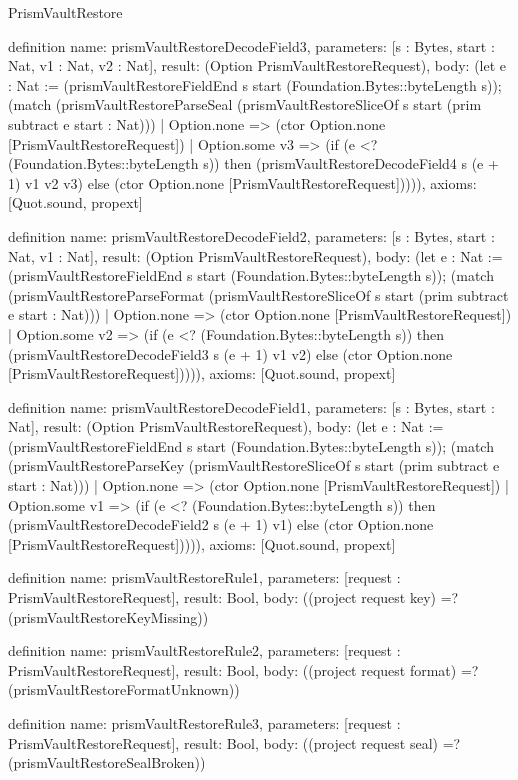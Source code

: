 \begin{lexlean}{PrismVaultRestore}
\begin{semanticmodule}
definition{
  name: prismVaultRestoreDecodeField3,
  parameters: [s : Bytes, start : Nat, v1 : Nat, v2 : Nat],
  result: (Option PrismVaultRestoreRequest),
  body: (let e : Nat := (prismVaultRestoreFieldEnd s start (Foundation.Bytes::byteLength s)); (match (prismVaultRestoreParseSeal (prismVaultRestoreSliceOf s start (prim subtract e start : Nat)))
    | Option.none => (ctor Option.none [PrismVaultRestoreRequest])
    | Option.some v3 => (if (e <? (Foundation.Bytes::byteLength s)) then (prismVaultRestoreDecodeField4 s (e + 1) v1 v2 v3) else (ctor Option.none [PrismVaultRestoreRequest])))),
  axioms: [Quot.sound, propext]
}

definition{
  name: prismVaultRestoreDecodeField2,
  parameters: [s : Bytes, start : Nat, v1 : Nat],
  result: (Option PrismVaultRestoreRequest),
  body: (let e : Nat := (prismVaultRestoreFieldEnd s start (Foundation.Bytes::byteLength s)); (match (prismVaultRestoreParseFormat (prismVaultRestoreSliceOf s start (prim subtract e start : Nat)))
    | Option.none => (ctor Option.none [PrismVaultRestoreRequest])
    | Option.some v2 => (if (e <? (Foundation.Bytes::byteLength s)) then (prismVaultRestoreDecodeField3 s (e + 1) v1 v2) else (ctor Option.none [PrismVaultRestoreRequest])))),
  axioms: [Quot.sound, propext]
}

definition{
  name: prismVaultRestoreDecodeField1,
  parameters: [s : Bytes, start : Nat],
  result: (Option PrismVaultRestoreRequest),
  body: (let e : Nat := (prismVaultRestoreFieldEnd s start (Foundation.Bytes::byteLength s)); (match (prismVaultRestoreParseKey (prismVaultRestoreSliceOf s start (prim subtract e start : Nat)))
    | Option.none => (ctor Option.none [PrismVaultRestoreRequest])
    | Option.some v1 => (if (e <? (Foundation.Bytes::byteLength s)) then (prismVaultRestoreDecodeField2 s (e + 1) v1) else (ctor Option.none [PrismVaultRestoreRequest])))),
  axioms: [Quot.sound, propext]
}

definition{
  name: prismVaultRestoreRule1,
  parameters: [request : PrismVaultRestoreRequest],
  result: Bool,
  body: ((project request key) =? (prismVaultRestoreKeyMissing))
}

definition{
  name: prismVaultRestoreRule2,
  parameters: [request : PrismVaultRestoreRequest],
  result: Bool,
  body: ((project request format) =? (prismVaultRestoreFormatUnknown))
}

definition{
  name: prismVaultRestoreRule3,
  parameters: [request : PrismVaultRestoreRequest],
  result: Bool,
  body: ((project request seal) =? (prismVaultRestoreSealBroken))
}


\end{semanticmodule}
\end{lexlean}
